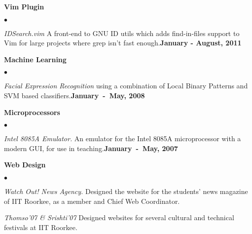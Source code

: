 \documentclass[margin,line]{res}
\newenvironment{list2}{
  \begin{list}{$\bullet$}{%
      \setlength{\itemsep}{0in}
      \setlength{\parsep}{0in} \setlength{\parskip}{0in}
      \setlength{\topsep}{0in} \setlength{\partopsep}{0in} 
      \setlength{\leftmargin}{0.2in}}}{\end{list}}
\begin{document}
\begin{resume}
{\bf Vim Plugin}
\begin{list2}
\item {\em IDSearch.vim} A front-end to GNU ID utils which adds find-in-files support to Vim for large projects where grep isn't fast enough.\hfill {\bf January - August, 2011}
\end{list2}

{\bf Machine Learning}
\begin{list2}
\item {\em Facial Expression Recognition} using a combination of Local Binary Patterns and SVM based classifiers.\hfill {\bf January~-~May, 2008}
\end{list2}

{\bf Microprocessors}
\begin{list2}
\item {\em Intel 8085A Emulator.} An emulator for the Intel 8085A microprocessor with a modern GUI, for use in teaching.\hfill {\bf January~-~May, 2007}
\end{list2}

{\bf Web Design}
\begin{list2}
\item {\em Watch Out! News Agency.} Designed the website for the students' news magazine of IIT Roorkee, as a member and Chief Web Coordinator.
\item {\em Thomso'07 \& Srishti'07} Designed websites for several cultural and technical festivals at IIT Roorkee.
\end{list2}


\end{resume}
\end{document}
